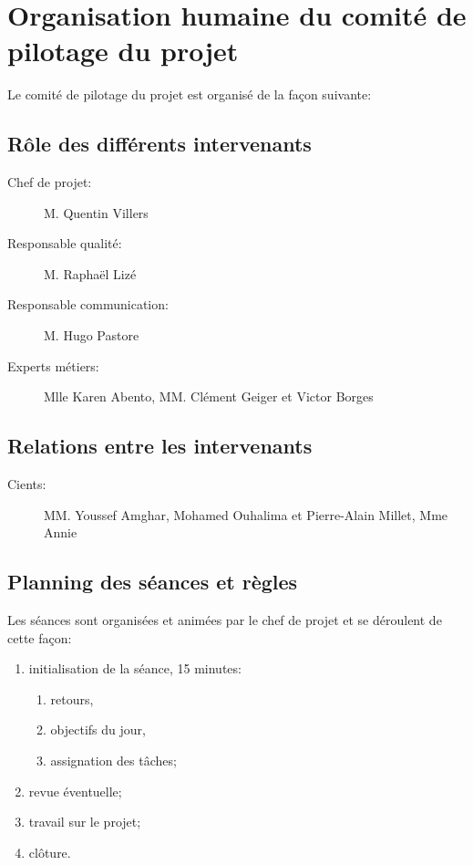 
\section{Organisation humaine du comité de pilotage du projet}

Le comité de pilotage du projet est organisé de la façon suivante:

    \subsection{Rôle des différents intervenants}
\begin{description}
\item[Chef de projet:]M. Quentin Villers
\item[Responsable qualité:]M. Raphaël Lizé
\item[Responsable communication:]M. Hugo Pastore
\item[Experts métiers:]Mlle Karen Abento, MM. Clément Geiger et Victor Borges
\end{description}

    \subsection{Relations entre les intervenants}
\begin{description}
\item[Cients:]MM. Youssef Amghar, Mohamed Ouhalima et Pierre-Alain Millet, Mme Annie
\end{description}

    \subsection{Planning des séances et règles}
Les séances sont organisées et animées par le chef de projet et se
déroulent de cette façon:
\begin{enumerate}
\item initialisation de la séance, 15 minutes:
    \begin{enumerate}
        \item retours,
        \item objectifs du jour,
        \item assignation des tâches;
    \end{enumerate}
\item revue éventuelle;
\item travail sur le projet;
\item clôture.
\end{enumerate}

